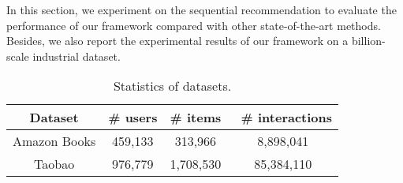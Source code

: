 
In this section, we experiment on the sequential recommendation to evaluate the performance of our framework compared with other state-of-the-art methods. Besides, we also report the experimental results of our framework on a billion-scale industrial dataset. 

\begin{table}
  \centering
  \caption{\label{tab:match_stats} Statistics of datasets.}
  \begin{tabular}{c|c|c|c}
    \hline \hline
    \textbf{Dataset} & \# users & \# items & \ \# interactions \\
    \hline
    Amazon Books & 459,133 & 313,966 & 8,898,041 \\
    Taobao & 976,779 & 1,708,530 & 85,384,110 \\
    \hline \hline
  \end{tabular}
\end{table}

